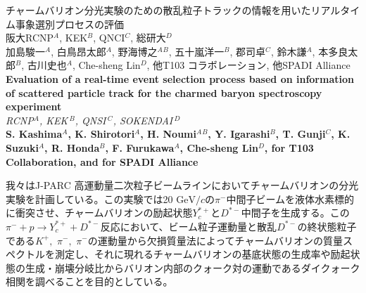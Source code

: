 \documentclass[12pt,a4paper,upLaTeX]{jsarticle}
\begin{document}
\vspace{-5pt}
\begin{center}
{\gt \Large チャームバリオン分光実験のための散乱粒子トラックの情報を用いたリアルタイム事象選別プロセスの評価 }\\[14pt]

{\gt \large 阪大RCNP$^A$, KEK$^B$, QNCI$^C$, 総研大$^D$ \\ 加島駿一$^A$, 白鳥昂太郎$^A$, 野海博之$^A$$^B$, 五十嵐洋一$^B$, 郡司卓$^C$, 鈴木謙$^A$, 本多良太郎$^B$, 古川史也$^A$, Che-sheng Lin$^D$, 他T103 コラボレーション, 他SPADI Alliance}\\[5pt]


{\large \bf Evaluation of a real-time event selection process based on
information of scattered particle track for the charmed baryon spectroscopy experiment }\\[5pt]

{\large \it RCNP$^A$, KEK\,$^B$, QNSI\,$^C$, SOKENDAI\,$^D$}\\

{\large \bf S. Kashima$^A$, K. Shirotori$^A$, H. Noumi$^A$$^B$, Y. Igarashi$^B$, T. Gunji$^C$, K.
Suzuki$^A$, R. Honda$^B$, F. Furukawa$^A$, Che-sheng Lin$^D$, for T103 Collaboration, and for SPADI Alliance}\\

\end{center}

\vspace{10pt}



我々はJ-PARC 高運動量二次粒子ビームラインにおいてチャームバリオンの分光実験を計画している。この実験では20 $\mathrm{GeV}/c$の$\pi^-$中間子ビームを液体水素標的に衝突させ、チャームバリオンの励起状態$Y_c^{*+}$と$D^
{*-}$中間子を生成する。この$\pi^-+p\rightarrow Y_c^{*+}+D^{*-}$反応において、ビーム粒子運動量と散乱$D^{*-}$の終状態粒子である$K^+,\,\,\pi^-,\,\,\pi^-$の運動量から欠損質量法によってチャームバリオンの質量スペクトルを測定し、それに現れるチャームバリオンの基底状態の生成率や励起状態の生成・崩壊分岐比からバリオン内部のクォーク対の運動であるダイクォーク相関を調べることを目的としている。
\end{document}
